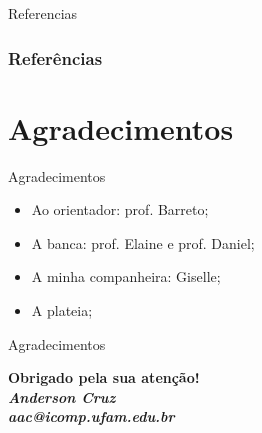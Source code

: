 \documentclass{beamer}
\begin{document}
\begin{frame}{Referencias}
\frametitle{Refer\^encias}
    \tiny{ }
    
\end{frame}


\section{Agradecimentos}
 \begin{frame}{Agradecimentos}
\begin{itemize}
 \item Ao orientador: prof. Barreto; 
\item A banca: prof. Elaine e prof. Daniel;
\item A minha companheira: Giselle;
\item A plateia;
\end{itemize}

\end{frame}

  \begin{frame}{Agradecimentos}
  \begin{center}
 
  \textcolor{VerdeUFAM}{\Large \textbf{Obrigado pela sua aten\c{c}\~ao!}} \\
  \vspace*{20px}
  \textit{\textbf{Anderson Cruz}} \\
  \textit{\textbf{aac@icomp.ufam.edu.br}}
 
  \end{center}
  \end{frame}

 
 
\end{document}
